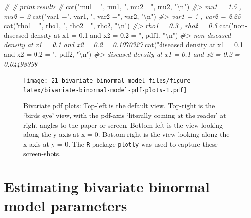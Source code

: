 \documentclass[
]{book}
\newenvironment{Shaded}{\begin{snugshade}}{\end{snugshade}}
\newcommand{\CommentTok}[1]{\textcolor[rgb]{0.56,0.35,0.01}{\textit{#1}}}
\newcommand{\FunctionTok}[1]{\textcolor[rgb]{0.00,0.00,0.00}{#1}}
\newcommand{\NormalTok}[1]{#1}
\newcommand{\SpecialCharTok}[1]{\textcolor[rgb]{0.00,0.00,0.00}{#1}}
\newcommand{\StringTok}[1]{\textcolor[rgb]{0.31,0.60,0.02}{#1}}
\begin{document}
\begin{Shaded}
\begin{Highlighting}[]
\CommentTok{\#}
\CommentTok{\# print results}
\CommentTok{\# }
\FunctionTok{cat}\NormalTok{(}\StringTok{"mu1 ="}\NormalTok{, mu1, }\StringTok{", mu2 ="}\NormalTok{, mu2, }\StringTok{"}\SpecialCharTok{\textbackslash{}n}\StringTok{"}\NormalTok{)}
\CommentTok{\#\textgreater{} mu1 = 1.5 , mu2 = 2}
\FunctionTok{cat}\NormalTok{(}\StringTok{"var1 ="}\NormalTok{, var1, }\StringTok{", var2 ="}\NormalTok{, var2, }\StringTok{"}\SpecialCharTok{\textbackslash{}n}\StringTok{"}\NormalTok{)}
\CommentTok{\#\textgreater{} var1 = 1 , var2 = 2.25}
\FunctionTok{cat}\NormalTok{(}\StringTok{"rho1 ="}\NormalTok{, rho1, }\StringTok{", rho2 ="}\NormalTok{, rho2, }\StringTok{"}\SpecialCharTok{\textbackslash{}n}\StringTok{"}\NormalTok{)}
\CommentTok{\#\textgreater{} rho1 = 0.3 , rho2 = 0.6}
\FunctionTok{cat}\NormalTok{(}\StringTok{"non{-}diseased density at x1 = 0.1 and x2 = 0.2 = "}\NormalTok{, pdf1, }\StringTok{"}\SpecialCharTok{\textbackslash{}n}\StringTok{"}\NormalTok{)}
\CommentTok{\#\textgreater{} non{-}diseased density at x1 = 0.1 and x2 = 0.2 =  0.1070327}
\FunctionTok{cat}\NormalTok{(}\StringTok{"diseased density at x1 = 0.1 and x2 = 0.2 = "}\NormalTok{, pdf2, }\StringTok{"}\SpecialCharTok{\textbackslash{}n}\StringTok{"}\NormalTok{)}
\CommentTok{\#\textgreater{} diseased density at x1 = 0.1 and x2 = 0.2 =  0.04498399}
\end{Highlighting}
\end{Shaded}

\begin{figure}
\centering
\texttt{[image: 21-bivariate-binormal-model\_files/figure-latex/bivariate-binormal-model-pdf-plots-1.pdf]}
\caption{\label{fig:bivariate-binormal-model-pdf-plots}Bivariate pdf plots: Top-left is the default view. Top-right is the `birds eye' view, with the pdf-axis `literally coming at the reader' at right angles to the paper or screen. Bottom-left is the view looking along the y-axis at x = 0. Bottom-right is the view looking along the x-axis at y = 0. The \texttt{R} package \texttt{plotly} was used to capture these screen-shots.}
\end{figure}

\hypertarget{bivariate-binormal-model-multivariate-density-estimation}{%
\section{Estimating bivariate binormal model parameters}\label{bivariate-binormal-model-multivariate-density-estimation}}
\end{document}
